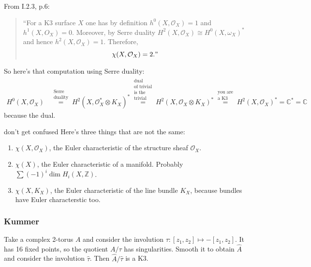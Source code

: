 \begin{remark}[\(\chi(\text{K3},\mathcal{O}_X)=2\)]\leavevmode
From \cite{huk} I.2.3, p.6:
\begin{quotation}
	``For a K3 surface \(X\) one has by definition \(h^{0}(X,\mathcal{O}_X)=1\) and \(h^{1}(X,O_X)=0\). Moreover, by Serre duality \(H^{2}(X,\mathcal{O}_X)\cong H^{0}(X,\omega_X)^*\) and hence \(h^{2}(X,\mathcal{O}_X)=1\). Therefore,
	\[\chi(X,\mathcal{O}_X)=2."\]
\end{quotation}
So here's that computation using Serre duality:
\begin{align*}
H^{0}(X,\mathcal{O}_X)&\overset{\substack{\text{Serre}  \\ \text{duality} } }{=}H^{2}(X,\mathcal{O}_X^*\otimes K_X)^* \overset{\substack{\text{dual}  \\ \text{of trivial} \\ \text{is the}\\\text{trivial} }}{=}H^{2}(X,\mathcal{O}_X \otimes K_X)^* \overset{\substack{\text{you are}  \\ \text{a K3} } }{=}H^{2}(X,\mathcal{O}_X)^*=\mathbb{C}^*=\mathbb{C}
\end{align*}
because the dual.
\end{remark}

\begin{thing7}{don't get confused}\leavevmode
Here's three things that are not the same:
\begin{enumerate}
\item \(\chi(X,\mathcal{O}_X)\), the Euler characteristic of the structure sheaf \(\mathcal{O}_X\).
\item \(\chi(X)\), the Euler characteristic of a manifold. Probably \(\sum (-1)^i \dim H_{i}(X,\mathbb{Z})\).
\item \(\chi(X,K_X)\), the Euler characteristic of the line bundle \(K_X\), because bundles have Euler characterstic too.
\end{enumerate}
\end{thing7}

\subsubsection{Kummer}

Take a complex 2-torus \(A\) and consider the involution \(\tau:[z_1,z_2]\mapsto -[z_1,z_2]\). It has 16 fixed points, so the quotient \(A/\tau\) has singularities. Smooth it to obtain \(\hat{A}\) and consider the involution \(\hat{\tau}\). Then \(\hat{A}/\hat{\tau}\) is a K3.

